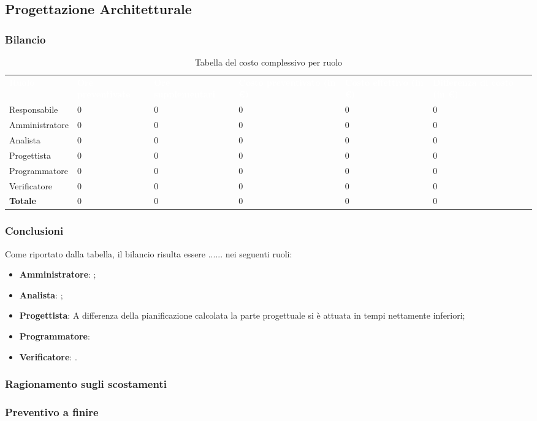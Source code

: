\subsection{Progettazione Architetturale}
\subsubsection{Bilancio}

{
\renewcommand{\arraystretch}{2}
\begin{longtable}[h]{ C{2.5cm} C{2.5cm} C{2.5cm} C{2.5cm} C{1.5cm} C{2.5cm}}
\caption{Tabella del costo complessivo per ruolo}\\

\textcolor{white}{\textbf{Ruolo}} & 
\textcolor{white}{\textbf{Ore preventivate}} & 
\textcolor{white}{\textbf{Ore supplementari}} & 
\textcolor{white}{\textbf{Costo preventivato (in \euro{})}} & 
\textcolor{white}{\textbf{Costo effettivo (in \euro{})}} & 
\textcolor{white}{\textbf{Differenza di costo (in \euro{})}}\\	
	
Responsabile    & 0 & 0 & 0 & 0 & 0 \\
Amministratore  & 0 & 0 & 0 & 0 & 0 \\
Analista        & 0 & 0 & 0 & 0 & 0 \\
Progettista     & 0 & 0 & 0 & 0 & 0 \\
Programmatore   & 0 & 0 & 0 & 0 & 0 \\
Verificatore    & 0 & 0 & 0 & 0 & 0 \\
\textbf{Totale} & 0 & 0 & 0 & 0 & 0 \\	

\end{longtable}
}

\subsubsection{Conclusioni}
Come riportato dalla tabella, il bilancio risulta essere ...... nei seguenti ruoli:
\begin{itemize}
	\item \textbf{Amministratore}: ;
	\item \textbf{Analista}: ;
	\item \textbf{Progettista}: A differenza della pianificazione calcolata la parte progettuale si è attuata in tempi nettamente inferiori;
	\item \textbf{Programmatore}: 
	\item \textbf{Verificatore}: .
\end{itemize}

\subsubsection{Ragionamento sugli scostamenti}

\subsubsection{Preventivo a finire}
